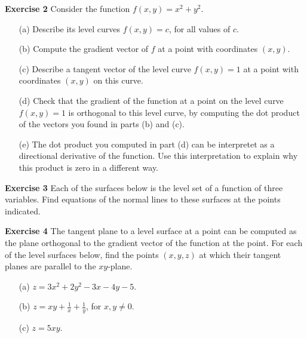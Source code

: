 \documentclass[12pt,oneside]{exam}
\newenvironment{exercise}[1]{\vspace{.1in}\noindent\textbf{Exercise #1 \hspace{.05em}}}{}
\begin{document}
\begin{exercise}{2} 
Consider the function $f(x,y)=x^2+y^2$. 
\begin{itemize}
\item[(a)] Describe its level curves $f(x,y)=c$, for all values of $c$. 
\item[(b)] Compute the gradient vector of $f$ at a point with coordinates $(x,y)$. 
\item[(c)] Describe a tangent vector of the level curve $f(x,y)=1$ at a point with coordinates $(x,y)$ on this curve. 
\item[(d)] Check that the gradient of the function at a point on the level curve $f(x,y)=1$ is orthogonal to this level curve, by computing the dot product of the vectors you found in parts (b) and (c). 
\item[(e)] The dot product you computed in part (d) can be interpretet as a directional derivative of the function. Use this interpretation to explain why this product is zero in a different way. 
\end{itemize}
\end{exercise}

\begin{exercise}{3}
Each of the surfaces below is the level set of a function of three variables. Find equations of the normal lines to these surfaces at the points indicated. 
\end{exercise}

\begin{exercise}{4}
The tangent plane to a level surface at a point can be computed as the plane orthogonal to the gradient vector of the function at the point.  For each of the level surfaces below, find the points $(x,y,z)$ at which their tangent planes are parallel to the $xy$-plane. 
\begin{itemize}
\item[(a)] $z=3x^2+2y^2-3x-4y-5$.
\item[(b)] $z=xy+\frac{1}{x} + \frac{1}{y}$, for $x,y \neq 0$.
\item[(c)] $z=5xy$.
\end{itemize}
\end{exercise}
\end{document}

